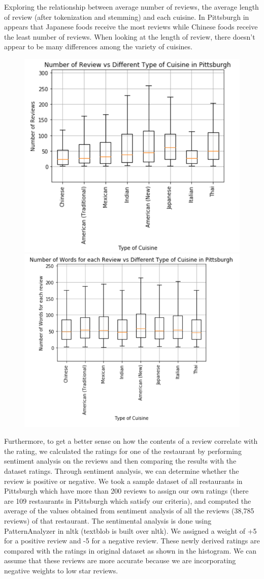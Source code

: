 \documentclass{neu_handout}
\begin{document}
Exploring the relationship between average number of reviews, the average length of review (after tokenization and stemming) and each cuisine. In Pittsburgh in appears that Japanese foods receive the most reviews while Chinese foods receive the least number of reviews. When looking at the length of review, there doesn't appear to be many differences among the variety of cuisines. 

\begin{figure}[h]
\centering
{
\includegraphics[width=0.4\linewidth]{number_of_review_vs_cuisine}
}
{
\includegraphics[width=0.45\linewidth]{average_review_length}
}
\end{figure}


Furthermore, to get a better sense on how the contents of a review correlate with the rating, we calculated the ratings for one of the restaurant by performing sentiment analysis on the reviews and then comparing the results with the dataset ratings. Through sentiment analysis, we can determine whether the review is positive or negative. We took a sample dataset of all restaurants in Pittsburgh which have more than 200 reviews to assign our own ratings (there are 109 restaurants in Pittsburgh which satisfy our criteria), and computed the average of the values obtained from sentiment analysis of all the reviews (38,785 reviews) of that restaurant. The sentimental analysis is done using PatternAnalyzer in nltk (textblob is built over nltk). We assigned a weight of +5 for a positive review and -5 for a negative review. These newly derived ratings are compared with the ratings in original dataset as shown in the histogram. We can assume that these reviews are more accurate because we are incorporating negative weights to low star reviews.
\end{document}
